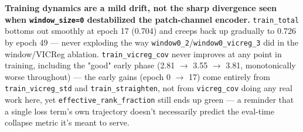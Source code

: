 \textbf{Training dynamics are a mild drift, not the sharp divergence seen when
\texttt{window\_size=0} destabilized the patch-channel encoder.} \texttt{train\_total}
bottoms out smoothly at epoch 17 (0.704) and creeps back up gradually to 0.726 by epoch
49 --- never exploding the way \texttt{window0\_2}/\texttt{window0\_vicreg\_3} did in the
window/VICReg ablation. \texttt{train\_vicreg\_cov} never improves at any point in
training, including the "good" early phase (2.81 $\to$ 3.55 $\to$ 3.81, monotonically
worse throughout) --- the early gains (epoch 0 $\to$ 17) come entirely from
\texttt{train\_vicreg\_std} and \texttt{train\_straighten}, not from \texttt{vicreg\_cov}
doing any real work here, yet \texttt{effective\_rank\_fraction} still ends up green ---
a reminder that a single loss term's own trajectory doesn't necessarily predict the
eval-time collapse metric it's meant to serve.
